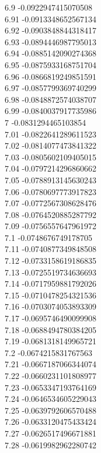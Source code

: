 {6.9	-0.0922947415070508\\
6.91	-0.0913348652567134\\
6.92	-0.0903848844318417\\
6.93	-0.0894446987795013\\
6.94	-0.0885142090274368\\
6.95	-0.0875933168751704\\
6.96	-0.0866819249851591\\
6.97	-0.0857799369740299\\
6.98	-0.0848872574038707\\
6.99	-0.0840037917735986\\
7	-0.0831294465103854\\
7.01	-0.0822641289611523\\
7.02	-0.0814077473841322\\
7.03	-0.0805602109405015\\
7.04	-0.0797214296860662\\
7.05	-0.0788913145630243\\
7.06	-0.0780697773917823\\
7.07	-0.0772567308628476\\
7.08	-0.0764520885287792\\
7.09	-0.0756557647961972\\
7.1	-0.0748676749178705\\
7.11	-0.0740877349848508\\
7.12	-0.0733158619186835\\
7.13	-0.0725519734636693\\
7.14	-0.0717959881792026\\
7.15	-0.0710478254321536\\
7.16	-0.0703074053893309\\
7.17	-0.0695746490099908\\
7.18	-0.0688494780384205\\
7.19	-0.0681318149965721\\
7.2	-0.0674215831767563\\
7.21	-0.0667187066344074\\
7.22	-0.0660231101808977\\
7.23	-0.0653347193764169\\
7.24	-0.0646534605229043\\
7.25	-0.0639792606570488\\
7.26	-0.0633120475433424\\
7.27	-0.0626517496671881\\
7.28	-0.0619982962280742\\
}
